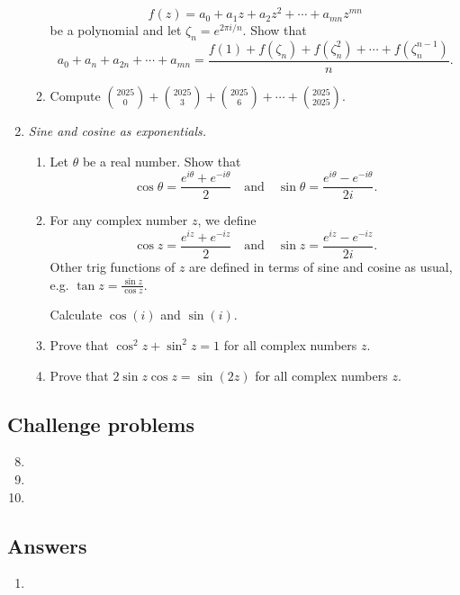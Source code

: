 \begin{enumerate}
\begin{enumerate}
\begin{equation*}
f(z) = a_0 + a_1z + a_2z^2 + \cdots + a_{mn}z^{mn}
\end{equation*}
be a polynomial and let $\zeta_n = e^{2\pi i/n}$. Show that
\begin{equation*}
a_0 + a_n + a_{2n} + \cdots + a_{mn} = \frac{f(1) + f(\zeta_n) + f(\zeta_n^2) + \cdots + f(\zeta_n^{n - 1})}{n}.
\end{equation*}
\item Compute $\binom{2025}{0} + \binom{2025}{3} + \binom{2025}{6} + \cdots + \binom{2025}{2025}$.
\end{enumerate}
\item \emph{Sine and cosine as exponentials.} 
\begin{enumerate}
\item Let $\theta$ be a real number. Show that
\begin{equation*}
\cos\theta = \frac{e^{i\theta} + e^{-i\theta}}{2}\quad\text{and}\quad\sin\theta = \frac{e^{i\theta} - e^{-i\theta}}{2i}.
\end{equation*}
\item For any complex number $z$, we define
\begin{equation*}
\cos z = \frac{e^{iz} + e^{-iz}}{2}\quad\text{and}\quad\sin z = \frac{e^{iz} - e^{-iz}}{2i}.
\end{equation*}
Other trig functions of $z$ are defined in terms of sine and cosine as usual, e.g. $\tan z = \frac{\sin z}{\cos z}$.\par
Calculate $\cos(i)$ and $\sin(i)$.
\item Prove that $\cos^2 z + \sin^2 z = 1$ for all complex numbers $z$.
\item Prove that $2\sin z\cos z = \sin(2z)$ for all complex numbers $z$.
\end{enumerate}
\end{enumerate}


\subsection{Challenge problems}

\begin{enumerate}\setcounter{enumi}{7}
\item %
\item %
\item %
\end{enumerate}


\newpage
\subsection{Answers}

\begin{enumerate}
\item 
\end{enumerate}
